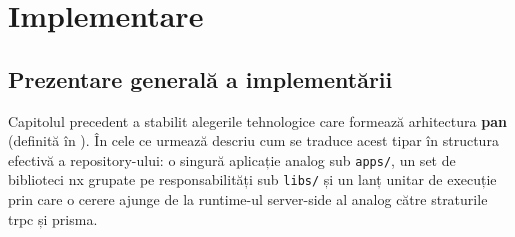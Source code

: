 \section{Implementare}\label{cap:implementare}

\subsection{Prezentare generală a implementării}

Capitolul precedent a stabilit alegerile tehnologice care formează arhitectura \textbf{\gls{pan}} (definită în ). În cele ce urmează descriu cum se traduce acest tipar în structura efectivă a repository-ului: o singură aplicație \gls{analog} sub \texttt{apps/}, un set de biblioteci \gls{nx} grupate pe responsabilități sub \texttt{libs/} și un lanț unitar de execuție prin care o cerere ajunge de la runtime-ul server-side al \gls{analog} către straturile \gls{trpc} și \gls{prisma}.

\needspace{15cm}
